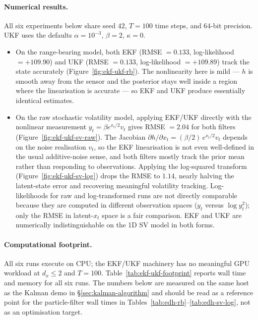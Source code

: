 \documentclass{article}
\begin{document}
\paragraph{Numerical results.} All six experiments below share seed $42$, $T = 100$ time steps, and 64-bit precision. UKF uses the defaults $\alpha = 10^{-3}$, $\beta = 2$, $\kappa = 0$.
\begin{itemize}
\item
On the range-bearing model, both EKF (RMSE $= 0.133$, log-likelihood $= +109.90$) and UKF (RMSE $= 0.133$, log-likelihood $= +109.89$) track the state accurately (Figure~\ref{fig:ekf-ukf-rb}). The nonlinearity here is mild --- $h$ is smooth away from the sensor and the posterior stays well inside a region where the linearisation is accurate --- so EKF and UKF produce essentially identical estimates.
\item
On the raw stochastic volatility model, applying EKF/UKF directly with the nonlinear measurement $y_t = \beta e^{x_t/2} v_t$ gives RMSE $= 2.04$ for both filters (Figure~\ref{fig:ekf-ukf-sv-raw}). The Jacobian $\partial h / \partial x_t = (\beta/2)\, e^{x_t/2} v_t$ depends on the noise realisation $v_t$, so the EKF linearisation is not even well-defined in the usual additive-noise sense, and both filters mostly track the prior mean rather than responding to observations. Applying the log-squared transform (Figure~\ref{fig:ekf-ukf-sv-log}) drops the RMSE to $1.14$, nearly halving the latent-state error and recovering meaningful volatility tracking. Log-likelihoods for raw and log-transformed runs are not directly comparable because they are computed in different observation spaces ($y_t$ versus $\log y_t^2$); only the RMSE in latent-$x_t$ space is a fair comparison. EKF and UKF are numerically indistinguishable on the 1D SV model in both forms.
\end{itemize}

\paragraph{Computational footprint.} All six runs execute on CPU; the EKF/UKF machinery has no meaningful GPU workload at $d_x \le 2$ and $T = 100$. Table~\ref{tab:ekf-ukf-footprint} reports wall time and memory for all six runs. The numbers below are measured on the same host as the Kalman demo in \S\ref{sec:kalman-algorithm} and should be read as a reference point for the particle-filter wall times in Tables~\ref{tab:edh-rb}--\ref{tab:edh-sv-log}, not as an optimisation target.
\end{document}
